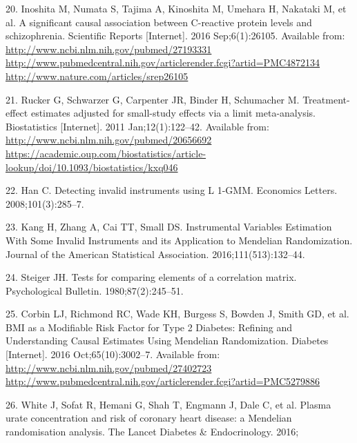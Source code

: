 \documentclass[]{article}
\begin{document}
\hypertarget{ref-Inoshita2016}{}
20. Inoshita M, Numata S, Tajima A, Kinoshita M, Umehara H, Nakataki M,
et al. A significant causal association between C-reactive protein
levels and schizophrenia. Scientific Reports {[}Internet{]}. 2016
Sep;6(1):26105. Available from:
\href{http://www.ncbi.nlm.nih.gov/pubmed/27193331\%20http://www.pubmedcentral.nih.gov/articlerender.fcgi?artid=PMC4872134\%20http://www.nature.com/articles/srep26105}{http://www.ncbi.nlm.nih.gov/pubmed/27193331 http://www.pubmedcentral.nih.gov/articlerender.fcgi?artid=PMC4872134 http://www.nature.com/articles/srep26105}

\hypertarget{ref-Rucker2011}{}
21. Rucker G, Schwarzer G, Carpenter JR, Binder H, Schumacher M.
Treatment-effect estimates adjusted for small-study effects via a limit
meta-analysis. Biostatistics {[}Internet{]}. 2011 Jan;12(1):122--42.
Available from:
\href{http://www.ncbi.nlm.nih.gov/pubmed/20656692\%20https://academic.oup.com/biostatistics/article-lookup/doi/10.1093/biostatistics/kxq046}{http://www.ncbi.nlm.nih.gov/pubmed/20656692 https://academic.oup.com/biostatistics/article-lookup/doi/10.1093/biostatistics/kxq046}

\hypertarget{ref-Han2008}{}
22. Han C. Detecting invalid instruments using L 1-GMM. Economics
Letters. 2008;101(3):285--7.

\hypertarget{ref-Kang2016}{}
23. Kang H, Zhang A, Cai TT, Small DS. Instrumental Variables Estimation
With Some Invalid Instruments and its Application to Mendelian
Randomization. Journal of the American Statistical Association.
2016;111(513):132--44.

\hypertarget{ref-Steiger1980}{}
24. Steiger JH. Tests for comparing elements of a correlation matrix.
Psychological Bulletin. 1980;87(2):245--51.

\hypertarget{ref-Corbin2016}{}
25. Corbin LJ, Richmond RC, Wade KH, Burgess S, Bowden J, Smith GD, et
al. BMI as a Modifiable Risk Factor for Type 2 Diabetes: Refining and
Understanding Causal Estimates Using Mendelian Randomization. Diabetes
{[}Internet{]}. 2016 Oct;65(10):3002--7. Available from:
\href{http://www.ncbi.nlm.nih.gov/pubmed/27402723\%20http://www.pubmedcentral.nih.gov/articlerender.fcgi?artid=PMC5279886}{http://www.ncbi.nlm.nih.gov/pubmed/27402723 http://www.pubmedcentral.nih.gov/articlerender.fcgi?artid=PMC5279886}

\hypertarget{ref-white2016plasma}{}
26. White J, Sofat R, Hemani G, Shah T, Engmann J, Dale C, et al. Plasma
urate concentration and risk of coronary heart disease: a Mendelian
randomisation analysis. The Lancet Diabetes \& Endocrinology. 2016;
\end{document}
